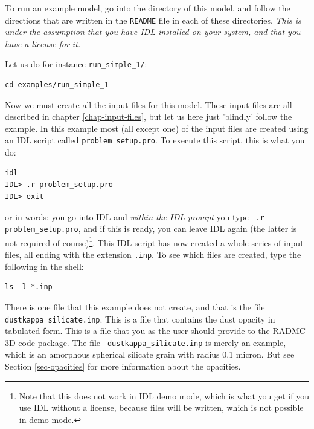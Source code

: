 \documentclass{report}
\begin{document}
To run an example model, go into the directory of this model, and follow the
directions that are written in the {\small\tt README} file in each of these
directories. {\em This is under the assumption that you have IDL installed on
your system, and that you have a license for it.}

Let us do for instance {\small\tt run\_simple\_1/}:
{\small\begin{verbatim}
cd examples/run_simple_1
\end{verbatim}}
Now we must create all the input files for this model. These input files are
all described in chapter \ref{chap-input-files}, but let us here just
'blindly' follow the example. In this example most (all except one) of the
input files are created using an IDL script called {\small\tt problem\_setup.pro}.
To execute this script, this is what you do:
{\small\begin{verbatim}
idl
IDL> .r problem_setup.pro 
IDL> exit
\end{verbatim}}
or in words: you go into IDL and {\em within the IDL prompt} you type {\small\tt
  .r problem\_setup.pro}, and if this is ready, you can leave IDL again (the
latter is not required of course)\footnote{Note that this does not work in IDL demo
  mode, which is what you get if you use IDL without a
  license, because files will be written, which is not possible in demo
  mode.}. This IDL script has now created a whole series
of input files, all ending with the extension {\small\tt .inp}. To see which
files are created, type the following in the shell: 
%
{\small\begin{verbatim}
ls -l *.inp
\end{verbatim}}

There is one file that this example does not create, and that is the file
{\small\tt dustkappa\_silicate.inp}. This is a file that contains the dust
opacity in tabulated form. This is a file that you as the user should
provide to the RADMC-3D code package. The file {\small\tt
  dustkappa\_silicate.inp} is merely an example, which is an
amorphous spherical silicate grain with radius 0.1 micron. But see
Section \ref{sec-opacities} for more information about the opacities.
\end{document}
